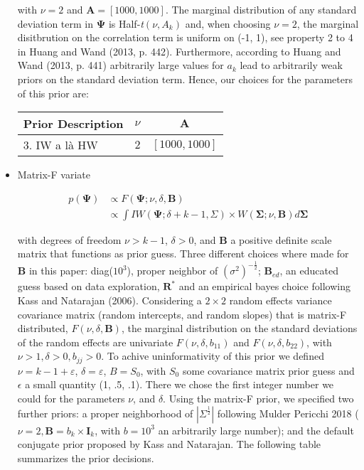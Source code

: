\documentclass[a4paper]{article}
\begin{document}
\begin{itemize}
with $\nu = 2$ and $\bm{A} = [1000, 1000]$. The marginal distribution of any standard deviation term in $\bm{\Psi}$ is Half-\textit{t}$(\nu, A_k)$ and, when choosing $\nu = 2$, the marginal disitbrution on the correlation term is uniform on (-1, 1), see property 2 to 4 in Huang and Wand (2013, p. 442). Furthermore, according to Huang and Wand (2013, p. 441) arbitrarily large values for $a_k$ lead to arbitrarily weak priors on the standard deviation term. Hence, our choices for the parameters of this prior are: 
	
\begin{center}
\begin{tabular}{ c c c }
 Prior Description & $\nu$ & $\bm{A}$ \\ 
 \hline
 \multicolumn{1}{l}{3. IW a là HW} & $2$ & $[1000, 1000]$ \\  
 \hline
\end{tabular}
\end{center}	
	
	\item Matrix-F variate
	
\begin{equation}
\begin{split}
p(\bm{\Psi})& \propto F(\bm{\Psi}; \nu, \delta, \bm{B}) \\
& \propto \int IW(\bm{\Psi}; \delta + k - 1, \Sigma) \times W(\bm{\Sigma}; \nu, \bm{B})d\bm{\Sigma}
\end{split}
\end{equation}	

with degrees of freedom $\nu>k-1$, $\delta>0$, and $\bm{B}$ a positive definite scale matrix that functions as prior guess. Three different choices where made for $\bm{B}$ in this paper: diag($10^3$), proper neighbor of $(\sigma^2)^{-\frac{1}{2}}$; $\bm{B}_{ed}$, an educated guess based on data exploration, $\bm{R^*}$ and an empirical bayes choice following Kass and Natarajan (2006).
Considering a $2 \times 2$ random effects variance covariance matrix (random intercepts, and random slopes) that is matrix-F distributed, $F(\nu, \delta, \bm{B})$, the marginal distribution on the standard deviations of the random effects are univariate $F(\nu, \delta, b_{11})$ and $F(\nu, \delta, b_{22})$, with $\nu >1, \delta > 0, b_{jj} > 0$. To achive uninformativity of this prior we defined $\nu = k -1 + \varepsilon $, $\delta = \varepsilon$, $B = S_0$, with $S_0$ some covariance matrix prior guess and $\epsilon$ a small quantity (1, .5, .1). There we chose the first integer number we could for the parameters $\nu$, and $\delta$. Using the matrix-F prior, we specified two further priors: a proper neighborhood of $|\Sigma^\frac{1}{2}|$ following Mulder Pericchi 2018 ($\nu = 2, \bm{B} = \textit{b}_k \times \bm{I}_k$, with $b=10^3$ an arbitrarily large number); and the default conjugate prior proposed by Kass and Natarajan. The following table summarizes the prior decisions.


\end{itemize}
\end{document}
